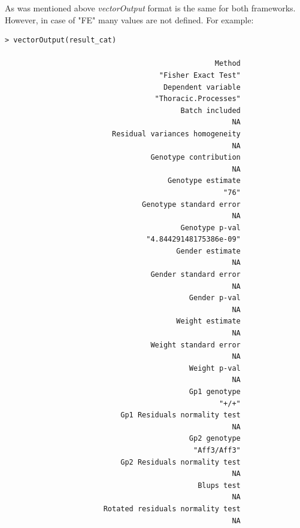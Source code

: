 \documentclass[12pt,a4paper]{article}
\begin{document}
As was mentioned above \textit{vectorOutput} format is the same for both frameworks. However, in case of "FE" many values are not defined. For example:

\begingroup
    \fontsize{8pt}{12pt}\selectfont
\begin{verbatim}
> vectorOutput(result_cat)

                                                 Method 
                                    "Fisher Exact Test" 
                                     Dependent variable 
                                   "Thoracic.Processes" 
                                         Batch included 
                                                     NA 
                         Residual variances homogeneity 
                                                     NA 
                                  Genotype contribution 
                                                     NA 
                                      Genotype estimate 
                                                   "76" 
                                Genotype standard error 
                                                     NA 
                                         Genotype p-val 
                                 "4.84429148175386e-09" 
                                        Gender estimate 
                                                     NA 
                                  Gender standard error 
                                                     NA 
                                           Gender p-val 
                                                     NA 
                                        Weight estimate 
                                                     NA 
                                  Weight standard error 
                                                     NA 
                                           Weight p-val 
                                                     NA 
                                           Gp1 genotype 
                                                  "+/+" 
                           Gp1 Residuals normality test 
                                                     NA 
                                           Gp2 genotype 
                                            "Aff3/Aff3" 
                           Gp2 Residuals normality test 
                                                     NA 
                                             Blups test 
                                                     NA 
                       Rotated residuals normality test 
                                                     NA 

\end{verbatim}
\end{document}
